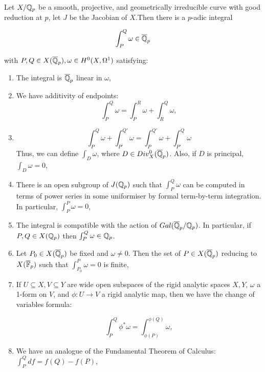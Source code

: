 \begin{theorem} \label{coleman_def}
Let $X/\mathbb{Q}_p$ be a smooth, projective, and geometrically irreducible curve with good reduction at $p$, let $J$ be the Jacobian of $X$.Then there is a $p$-adic integral 

\[ \int_P^Q \omega \in \overline{\mathbb{Q}}_p\]

with $P,Q \in X(\overline{\mathbb{Q}}_p), \omega \in H^0(X,\Omega^1)$ satisfying:

\begin{enumerate}
    \item The integral is $\overline{\mathbb{Q}}_p$ linear in $\omega$,
    \item We have additivity of endpoints:
    \begin{equation*}
        \int_P^Q \omega = \int_P^R \omega + \int_R^Q \omega,
    \end{equation*}
    \item 
    \begin{equation*}
        \int_P^Q \omega + \int_{P'}^{Q'} \omega = \int_P^{Q'} \omega + \int_{P'}^Q \omega
    \end{equation*}
        Thus, we can define $\int_D \omega$, where $D \in Div^0_X(\overline{\mathbb{Q}}_p)$. Also, if $D$ is principal, $\int_D \omega = 0$,
        
    \item There is an open subgroup of $J(\mathbb{Q}_p)$ such that $\int_P^Q \omega$ can be computed in terms of power series in some uniformiser by formal term-by-term integration. In particular, $\int_P^P \omega = 0$,



        \item The integral is compatible with the action of $Gal(\overline{\mathbb{Q}}_p/\mathbb{Q}_p)$. In particular, if $P,Q \in X(\mathbb{Q}_p)$ then $\int_P^Q \omega \in \mathbb{Q}_p$.
        \item Let $P_0 \in X(\overline{\mathbb{Q}}_p)$ be fixed and $\omega \neq 0$. Then the set of $P \in X(\overline{\mathbb{Q}}_p)$ reducing to $X(\overline{\mathbb{F}}_p)$ such that $\int_{P_0}^P \omega = 0$ is finite,

        \item If $U \subseteq X, V \subseteq Y $ are wide open subspaces of the rigid analytic spaces $X,Y$, $\omega$ a 1-form on $V$, and $\phi:U \rightarrow V$ a rigid analytic map, then we have the change of variables formula:
        
        \begin{equation*}
            \int_P^Q \phi^* \omega = \int_{\phi(P)}^{\phi(Q)} \omega,
        \end{equation*}
        \item We have an analogue of the Fundamental Theorem of Calculus: $\int_P^Q df = f(Q) - f(P)$,

\end{enumerate}
\end{theorem}

